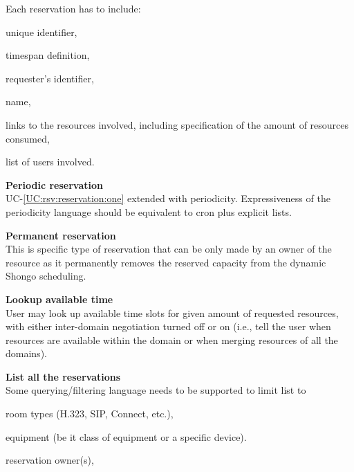 \documentclass[a4paper]{report}
\makeatletter
\newcounter{UCcounter}
\newenvironment{UseCases}%
	{\begin{list}{\textbf{UC-\arabic{UCcounter}}}{\@nmbrlisttrue\def\@listctr{UCcounter}}}%
	{\end{list}}
\newcommand{\UClabel}[1]{\label{UC:#1}}
\newcommand{\UCref}[1]{UC-\ref{UC:#1}}
\newcommand{\UseCase}[2]{\item\UClabel{#2} \textbf{#1}\\}
\makeatother
\begin{document}
\begin{UseCases}
Each reservation has to include:

\begin{compactitem}

\item unique identifier,

\item timespan definition,

\item requester's identifier,

\item name,

\item links to the resources involved, including specification of the amount of resources consumed,

\item list of users involved.

\end{compactitem}



\UseCase{Periodic reservation}{rsv:reservation:periodic}

\UCref{rsv:reservation:one} extended with periodicity. Expressiveness of the
periodicity language should be equivalent to cron plus explicit lists.

\UseCase{Permanent reservation}{rsv:reservation:permanent}

This is specific type of reservation that can be only made by an owner of the
resource as it permanently removes the reserved capacity from the dynamic
Shongo scheduling.

\UseCase{Lookup available time}{rsv:lookup:time}

User may look up available time slots for given amount of requested resources,
with either inter-domain negotiation turned off or on (i.e., tell the user when
resources are available within the domain or when merging resources of all the
domains).

\UseCase{List all the reservations}{rsv:list}

Some querying/filtering language needs to be supported to limit list to

\begin{compactitem}

\item room types (H.323, SIP, Connect, etc.),

\item equipment (be it class of equipment or a specific device).

\item reservation owner(s),


\end{compactitem}
\end{UseCases}
\end{document}
